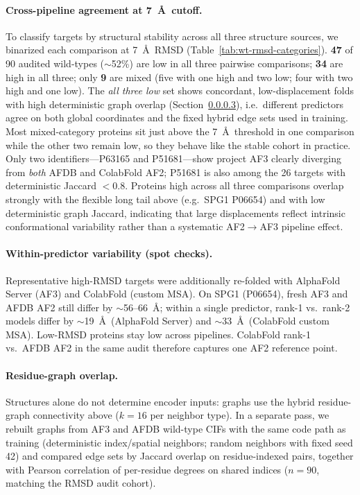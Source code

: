 \documentclass[11pt,a4paper]{article}
\begin{document}
\paragraph{Cross-pipeline agreement at 7~\AA\ cutoff.}
To classify targets by structural stability across all three structure sources, we binarized each comparison at 7~\AA\ RMSD (Table~\ref{tab:wt-rmsd-categories}). \textbf{47} of 90 audited wild-types ($\sim$52\%) are low in all three pairwise comparisons; \textbf{34} are high in all three; only \textbf{9} are mixed (five with one high and two low; four with two high and one low). The \emph{all three low} set shows concordant, low-displacement folds with high deterministic graph overlap (Section~\ref{sec:wt-graph-overlap}), i.e.\ different predictors agree on both global coordinates and the fixed hybrid edge sets used in training. Most mixed-category proteins sit just above the 7~\AA\ threshold in one comparison while the other two remain low, so they behave like the stable cohort in practice. Only two identifiers---P63165 and P51681---show project AF3 clearly diverging from \emph{both} AFDB and ColabFold AF2; P51681 is also among the 26 targets with deterministic Jaccard $<0.8$. Proteins high across all three comparisons overlap strongly with the flexible long tail above (e.g.\ SPG1 P06654) and with low deterministic graph Jaccard, indicating that large displacements reflect intrinsic conformational variability rather than a systematic AF2$\rightarrow$AF3 pipeline effect.

\paragraph{Within-predictor variability (spot checks).}
Representative high-RMSD targets were additionally re-folded with AlphaFold Server (AF3) and ColabFold (custom MSA). On SPG1 (P06654), fresh AF3 and AFDB AF2 still differ by $\sim$56--66~\AA; within a single predictor, rank-1 vs.\ rank-2 models differ by $\sim$19~\AA\ (AlphaFold Server) and $\sim$33~\AA\ (ColabFold custom MSA). Low-RMSD proteins stay low across pipelines. ColabFold rank-1 vs.\ AFDB AF2 in the same audit therefore captures one AF2 reference point.

\paragraph{Residue-graph overlap.}
\label{sec:wt-graph-overlap}
Structures alone do not determine encoder inputs: graphs use the hybrid residue-graph connectivity above ($k{=}16$ per neighbor type). In a separate pass, we rebuilt graphs from AF3 and AFDB wild-type CIFs with the same code path as training (deterministic index/spatial neighbors; random neighbors with fixed seed 42) and compared edge sets by Jaccard overlap on residue-indexed pairs, together with Pearson correlation of per-residue degrees on shared indices ($n{=}90$, matching the RMSD audit cohort).
\end{document}
